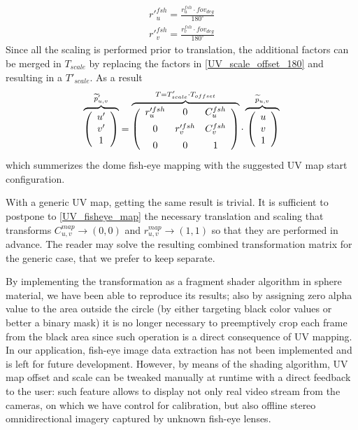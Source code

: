 \begin{equation}
\begin{array}{c}
r'^{fsh}_{u}=\frac{r^{fsh}_{u} \cdot fov_{deg}}{180^{\circ}}\\[0.6em]
r'^{fsh}_{v}=\frac{r^{fsh}_{v} \cdot fov_{deg}}{180^{\circ}}
\end{array}
\end{equation}
Since all the scaling is performed prior to translation, the additional factors can be merged in $T_{scale}$ by replacing the factors in \ref{UV_scale_offset_180} and resulting in a $T'_{scale}$.
As a result
\begin{equation}
\overbrace{
\left(\begin{array}{c}
u'\\
v'\\
1
\end{array}\right)
}^{\widetilde p'_{u,v}}=
\overbrace{
\left( \begin{array}{ccc}
r'^{fsh}_{u} & 0 & C^{fsh}_{u}\\[0.5em]
0 & r'^{fsh}_{v} & C^{fsh}_{v}\\[0.5em]
0 & 0 & 1
\end{array} \right)
}^{T=T'_{scale} \cdot T_{offset}}
 \cdot 
\xoverbrace{
\left(
\begin{array}{c}
u\\
v\\
1
\end{array}
\right)
}^{\widetilde p_{u,v}}
\label{UV_fisheye_map}
\end{equation}
which summerizes the dome fish-eye mapping with the suggested UV map start configuration.

With a generic UV map, getting the same result is trivial. It is sufficient to postpone to \ref{UV_fisheye_map} the necessary translation and scaling that transforms $C^{map}_{u,v} \longrightarrow (0,0)$ and $r^{map}_{u,v} \longrightarrow (1,1)$ so that they are performed in advance. The reader may solve the resulting combined transformation matrix for the generic case, that we prefer to keep separate.

By implementing the transformation as a fragment shader algorithm in sphere material, we have been able to reproduce its results; also by assigning zero alpha value to the area outside the circle (by either targeting black color values or better a binary mask) it is no longer necessary to preemptively crop each frame from the black area since such operation is a direct consequence of UV mapping.\\
In our application, fish-eye image data extraction has not been implemented and is left for future development. However, by means of the shading algorithm, UV map offset and scale can be tweaked manually at runtime with a direct feedback to the user: such feature allows to display not only real video stream from the cameras, on which we have control for calibration, but also offline stereo omnidirectional imagery captured by unknown fish-eye lenses.



